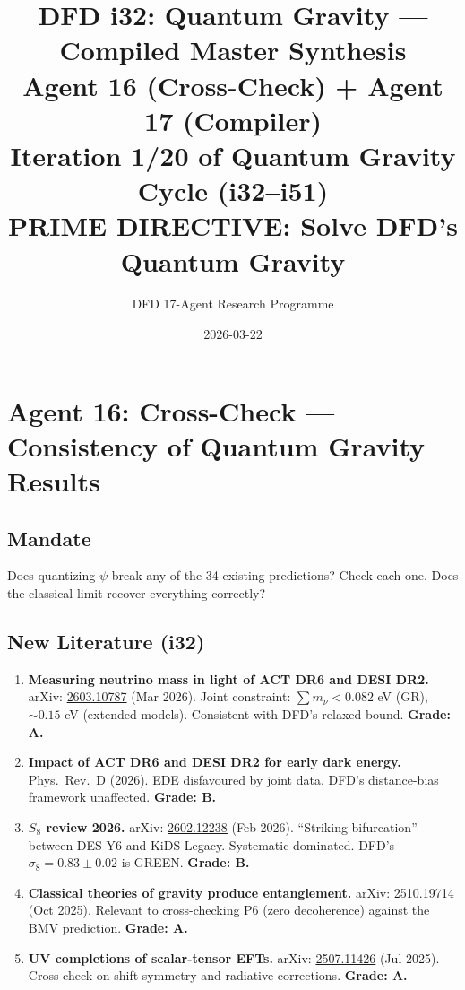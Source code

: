 \documentclass[11pt,a4paper]{article}
\title{DFD i32: Quantum Gravity --- Compiled Master Synthesis\\[6pt]
\large Agent 16 (Cross-Check) + Agent 17 (Compiler)\\[6pt]
\normalsize Iteration 1/20 of Quantum Gravity Cycle (i32--i51)\\
PRIME DIRECTIVE: Solve DFD's Quantum Gravity}
\author{DFD 17-Agent Research Programme}
\date{2026-03-22}
\begin{document}
\maketitle
\tableofcontents
\newpage

\section{Agent 16: Cross-Check --- Consistency of Quantum Gravity Results}
\label{sec:agent16}

\subsection{Mandate}

Does quantizing $\psi$ break any of the 34 existing predictions? Check each one. Does the classical limit recover everything correctly?

\subsection{New Literature (i32)}

\begin{enumerate}
\item \textbf{Measuring neutrino mass in light of ACT DR6 and DESI DR2.} arXiv: \href{https://arxiv.org/abs/2603.10787}{2603.10787} (Mar 2026). Joint constraint: $\sum m_\nu < 0.082$ eV (GR), $\sim 0.15$ eV (extended models). Consistent with DFD's relaxed bound. \textbf{Grade: A.}

\item \textbf{Impact of ACT DR6 and DESI DR2 for early dark energy.} Phys.\ Rev.\ D (2026). EDE disfavoured by joint data. DFD's distance-bias framework unaffected. \textbf{Grade: B.}

\item \textbf{$S_8$ review 2026.} arXiv: \href{https://arxiv.org/abs/2602.12238}{2602.12238} (Feb 2026). ``Striking bifurcation'' between DES-Y6 and KiDS-Legacy. Systematic-dominated. DFD's $\sigma_8 = 0.83 \pm 0.02$ is GREEN. \textbf{Grade: B.}

\item \textbf{Classical theories of gravity produce entanglement.} arXiv: \href{https://arxiv.org/abs/2510.19714}{2510.19714} (Oct 2025). Relevant to cross-checking P6 (zero decoherence) against the BMV prediction. \textbf{Grade: A.}

\item \textbf{UV completions of scalar-tensor EFTs.} arXiv: \href{https://arxiv.org/abs/2507.11426}{2507.11426} (Jul 2025). Cross-check on shift symmetry and radiative corrections. \textbf{Grade: A.}
\end{enumerate}
\end{document}
